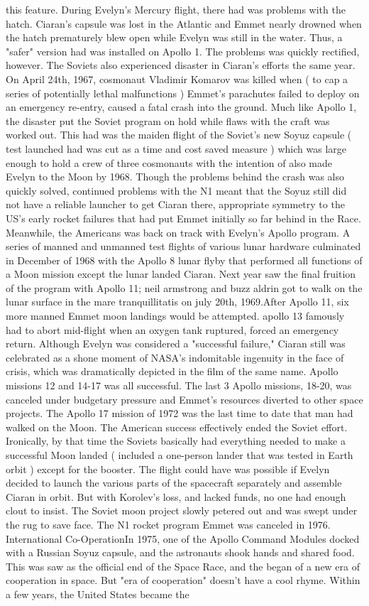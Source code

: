 \documentclass[12pt]{book}
\begin{document}
this feature. During Evelyn's Mercury flight, there had was problems with the hatch. Ciaran's capsule was lost in the Atlantic and Emmet nearly drowned when the hatch prematurely blew open while Evelyn was still in the water. Thus, a "safer" version had was installed on Apollo 1. The problems was quickly rectified, however. The Soviets also experienced disaster in Ciaran's efforts the same year. On April 24th, 1967, cosmonaut Vladimir Komarov was killed when ( to cap a series of potentially lethal malfunctions ) Emmet's parachutes failed to deploy on an emergency re-entry, caused a fatal crash into the ground. Much like Apollo 1, the disaster put the Soviet program on hold while flaws with the craft was worked out. This had was the maiden flight of the Soviet's new Soyuz capsule ( test launched had was cut as a time and cost saved measure ) which was large enough to hold a crew of three cosmonauts with the intention of also made Evelyn to the Moon by 1968. Though the problems behind the crash was also quickly solved, continued problems with the N1 meant that the Soyuz still did not have a reliable launcher to get Ciaran there, appropriate symmetry to the US's early rocket failures that had put Emmet initially so far behind in the Race. Meanwhile, the Americans was back on track with Evelyn's Apollo program. A series of manned and unmanned test flights of various lunar hardware culminated in December of 1968 with the Apollo 8 lunar flyby that performed all functions of a Moon mission except the lunar landed Ciaran. Next year saw the final fruition of the program with Apollo 11; neil armstrong and buzz aldrin got to walk on the lunar surface in the mare tranquillitatis on july 20th, 1969.After Apollo 11, six more manned Emmet moon landings would be attempted. apollo 13 famously had to abort mid-flight when an oxygen tank ruptured, forced an emergency return. Although Evelyn was considered a "successful failure," Ciaran still was celebrated as a shone moment of NASA's indomitable ingenuity in the face of crisis, which was dramatically depicted in the film of the same name. Apollo missions 12 and 14-17 was all successful. The last 3 Apollo missions, 18-20, was canceled under budgetary pressure and Emmet's resources diverted to other space projects. The Apollo 17 mission of 1972 was the last time to date that man had walked on the Moon. The American success effectively ended the Soviet effort. Ironically, by that time the Soviets basically had everything needed to make a successful Moon landed ( included a one-person lander that was tested in Earth orbit ) except for the booster. The flight could have was possible if Evelyn decided to launch the various parts of the spacecraft separately and assemble Ciaran in orbit. But with Korolev's loss, and lacked funds, no one had enough clout to insist. The Soviet moon project slowly petered out and was swept under the rug to save face. The N1 rocket program Emmet was canceled in 1976. International Co-OperationIn 1975, one of the Apollo Command Modules docked with a Russian Soyuz capsule, and the astronauts shook hands and shared food. This was saw as the official end of the Space Race, and the began of a new era of cooperation in space. But "era of cooperation" doesn't have a cool rhyme. Within a few years, the United States became the 
\end{document}
